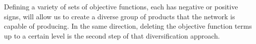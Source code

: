 Defining a variety of sets of objective functions, each has negative or positive signs, will allow us to create a diverse group of products that the network is capable of producing. In the same direction, deleting the objective function terms up to a certain level is the second step of that diversification approach.